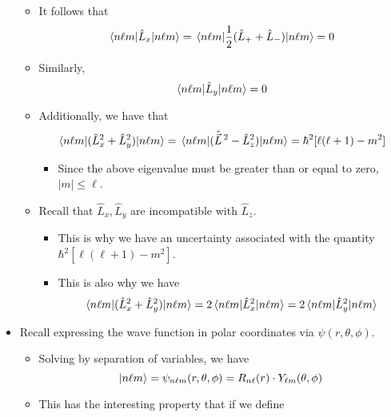 \documentclass[../notes.tex]{subfiles}
\begin{document}
\begin{itemize}
\begin{itemize}
        \item It follows that
        \begin{equation*}
            \ev{\hat{L}_x}{n\ell m} = \ev{\frac{1}{2}(\hat{L}_++\hat{L}_-)}{n\ell m} = 0
        \end{equation*}
        \item Similarly,
        \begin{equation*}
            \ev{\hat{L}_y}{n\ell m} = 0
        \end{equation*}
        \item Additionally, we have that
        \begin{equation*}
            \ev{(\hat{L}_x^2+\hat{L}_y^2)}{n\ell m} = \ev{(\hat{\vec{L}}{\,}^2-\hat{L}_z^2)}{n\ell m} = \hbar^2[\ell(\ell+1)-m^2]
        \end{equation*}
        \begin{itemize}
            \item Since the above eigenvalue must be greater than or equal to zero, $|m|\leq\ell$.
        \end{itemize}
        \item Recall that $\hat{L}_x,\hat{L}_y$ are incompatible with $\hat{L}_z$.
        \begin{itemize}
            \item This is why we have an uncertainty associated with the quantity $\hbar^2[\ell(\ell+1)-m^2]$.
            \item This is also why we have
            \begin{equation*}
                \ev{(\hat{L}_x^2+\hat{L}_y^2)}{n\ell m} = 2\ev{\hat{L}_x^2}{n\ell m}
                = 2\ev{\hat{L}_y^2}{n\ell m}
            \end{equation*}
        \end{itemize}
    \end{itemize}
    \item Recall expressing the wave function in polar coordinates via $\psi(r,\theta,\phi)$.
    \begin{itemize}
        \item Solving by separation of variables, we have
        \begin{equation*}
            \ket{n\ell m} = \psi_{n\ell m}(r,\theta,\phi)
            = R_{n\ell}(r)\cdot Y_{\ell m}(\theta,\phi)
        \end{equation*}
        \item This has the interesting property that if we define
        \begin{equation*}

\end{equation*}
\end{itemize}
\end{itemize}
\end{document}
